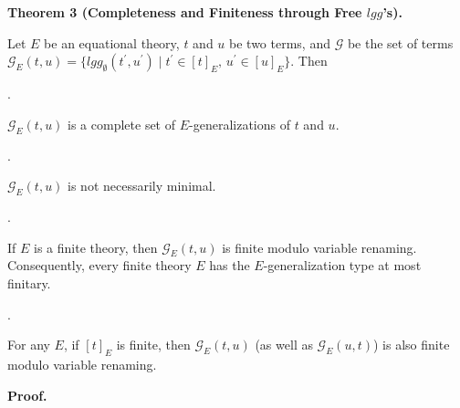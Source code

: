 \documentclass[10pt,a4paper]{amsart}
\begin{document}
 
\par\medskip\noindent\textbf{Theorem 3 (Completeness and Finiteness through Free $\mathit{lgg}$’s).}\par
 
 
Let $E$ be an equational theory, $t$ and $u$ be two terms, and $\mathcal{G}$ be the set of terms $\mathcal{G}_{E}(t,u)=\{\mathit{lgg}_{\emptyset}(t^{\prime},u^{\prime})\mid t^{\prime}\in[t]_{E},\,u^{\prime}\in[u]_{E}\}$. Then\par
  
\par{}. 
 
$\mathcal{G}_{E}(t,u)$ is a complete set of $E$-generalizations of $t$ and $u$.\par
 
 
 
\par{}. 
 
$\mathcal{G}_{E}(t,u)$ is not necessarily minimal.\par
 
 
 
\par{}. 
 
If $E$ is a finite theory, then $\mathcal{G}_{E}(t,u)$ is finite modulo variable renaming. Consequently, every finite theory $E$ has the $E$-generalization type at most finitary.\par
 
 
 
\par{}. 
 
For any $E$, if $[t]_{E}$ is finite, then $\mathcal{G}_{E}(t,u)$ (as well as $\mathcal{G}_{E}(u,t)$) is also finite modulo variable renaming.\par
 
 
  
 
 
 
 
\par\medskip\noindent\textbf{Proof.}\par
 
\end{document}
